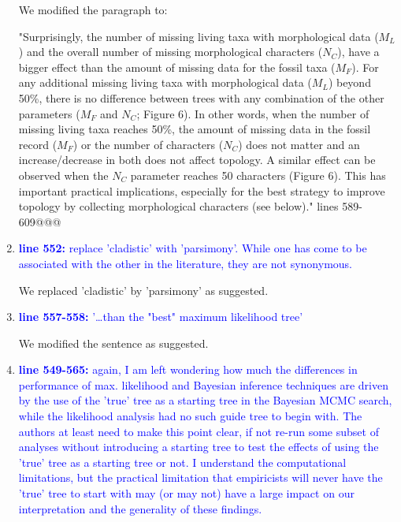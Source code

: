 \documentclass[12pt,letterpaper]{article}
\begin{document}
\begin{enumerate}
We modified the paragraph to:

"Surprisingly, the number of missing living taxa with morphological data ($M_{L}$) and the overall number of missing morphological characters ($N_{C}$), have a bigger effect than the amount of missing data for the fossil taxa ($M_{F}$).
For any additional missing living taxa with morphological data ($M_L$) beyond 50\%, there is no difference between trees with any combination of the other parameters ($M_F$ and $N_C$; Figure 6).
In other words, when the number of missing living taxa reaches 50\%, the amount of missing data in the fossil record ($M_F$) or the number of characters ($N_C$) does not matter and an increase/decrease in both does not affect topology.
A similar effect can be observed when the $N_C$ parameter reaches 50 characters (Figure 6).
This has important practical implications, especially for the best strategy to improve topology by collecting morphological characters (see below)." lines 589-609@@@

\item{\textcolor{blue}{\textbf{line 552:} replace 'cladistic' with 'parsimony'. While one has come to be associated with the other in the literature, they are not synonymous. }}

We replaced 'cladistic' by 'parsimony' as suggested.

\item{\textcolor{blue}{\textbf{line 557-558:} '…than the "best" maximum likelihood tree'}}

We modified the sentence as suggested.

\item{\textcolor{blue}{\textbf{line 549-565:} again, I am left wondering how much the differences in performance of max. likelihood and Bayesian inference techniques are driven by the use of the 'true' tree as a starting tree in the Bayesian MCMC search, while the likelihood analysis had no such guide tree to begin with. The authors at least need to make this point clear, if not re-run some subset of analyses without introducing a starting tree to test the effects of using the 'true' tree as a starting tree or not. I understand the computational limitations, but the practical limitation that empiricists will never have the 'true' tree to start with may (or may not) have a large impact on our interpretation and the generality of these findings. }}


\end{enumerate}
\end{document}
